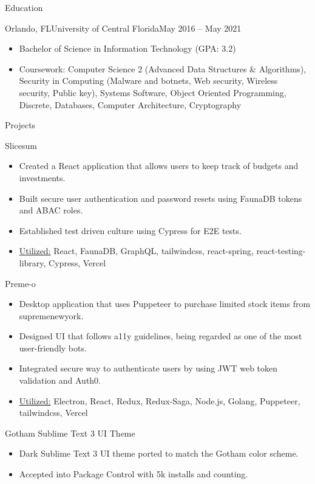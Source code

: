\documentclass[calibri]{mcdowellcv}
\begin{document}
	\begin{cvsection}{Education}
		\begin{cvsubsection}{Orlando, FL}{University of Central Florida}{May 2016 -- May 2021}
			\begin{itemize}
				\item Bachelor of Science in Information Technology (GPA: 3.2)
				\item Coursework: Computer Science 2 (Advanced Data Structures \& Algorithms), Security in Computing (Malware and botnets, Web security, Wireless security, Public key), Systems Software, Object Oriented Programming, Discrete, Databases, Computer Architecture, Cryptography
			\end{itemize}
		\end{cvsubsection}
	\end{cvsection}
	
	\begin{cvsection}{Projects}
		\begin{cvsubsection}{Slicesum}{}{}
			\begin{itemize}
        \item Created a React application that allows users to keep track of budgets and investments.
        \item Built secure user authentication and password resets using FaunaDB tokens and ABAC roles.
        \item Established test driven culture using Cypress for E2E tests.
				\item \underline{Utilized:} React, FaunaDB, GraphQL, tailwindcss, react-spring, react-testing-library, Cypress, Vercel
    	\end{itemize}
		\end{cvsubsection}

		\begin{cvsubsection}{Preme-o}{}{}
			\begin{itemize}
        \item Desktop application that uses Puppeteer to purchase limited stock items from supremenewyork.
        \item Designed UI that follows a11y guidelines, being regarded as one of the most user-friendly bots.
        \item Integrated secure way to authenticate users by using JWT web token validation and Auth0.
				\item \underline{Utilized:} Electron, React, Redux, Redux-Saga, Node.js, Golang, Puppeteer, tailwindcss, Vercel
    	\end{itemize}
		\end{cvsubsection}

		\begin{cvsubsection}{Gotham Sublime Text 3 UI Theme}{}{}
			\begin{itemize}
        \item Dark Sublime Text 3 UI theme ported to match the Gotham color scheme.
        \item Accepted into Package Control with 5k installs and counting.
    	\end{itemize}
		\end{cvsubsection}
	\end{cvsection}
	
\end{document}
